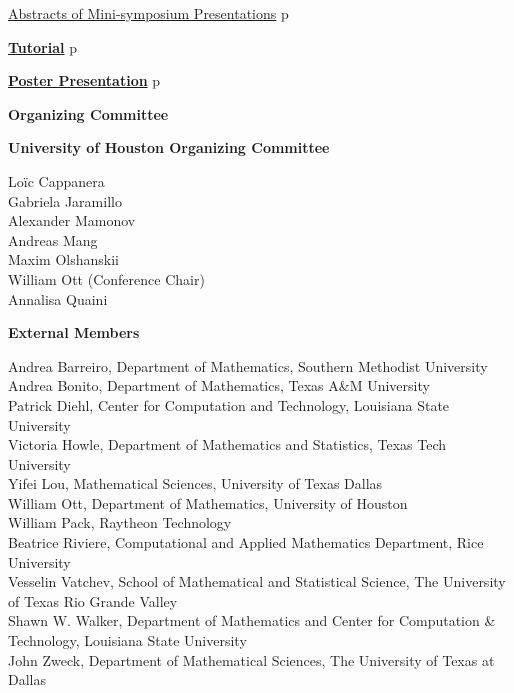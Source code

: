 \noindent\quad\hyperref[absmini]{{\large  Abstracts of Mini-symposium Presentations}}%
\dotfill{}p\pageref{absmini}
\vspace{3ex}

\noindent\hyperref[tutorial]{{\bfseries\large  Tutorial}}%
\dotfill{}p\pageref{tutorial}
\vspace{3ex}

\noindent\hyperref[poster]{{\bfseries\large  Poster Presentation}}
\dotfill{}p\pageref{poster}

\newpage\newpage
\thispagestyle{empty}
\newpage
\clearpage


\thispagestyle{empty}
\label{committee}
\centerline{\bfseries\Large Organizing Committee}
\vspace{10ex}

\noindent
{\bfseries\large  University of Houston Organizing Committee}
\vspace{1ex}

\noindent
Loïc Cappanera\\
Gabriela Jaramillo\\
Alexander Mamonov\\
Andreas Mang\\
Maxim Olshanskii\\
William Ott (Conference Chair)\\
Annalisa Quaini

\vspace{4ex}

\noindent
{\bfseries\large  External Members}

\vspace{1ex}

\noindent
Andrea Barreiro, Department of Mathematics, Southern Methodist University\\
Andrea Bonito, Department of Mathematics, Texas A\&M University\\
Patrick Diehl, Center for Computation and Technology, Louisiana State University\\
Victoria Howle, Department of Mathematics and Statistics, Texas Tech University\\
Yifei Lou, Mathematical Sciences, University of Texas Dallas\\
William Ott, Department of Mathematics, University of Houston\\
William Pack, Raytheon Technology\\
Beatrice Riviere, Computational and Applied Mathematics Department, Rice University\\
Vesselin Vatchev, School of Mathematical and Statistical Science, The University of Texas Rio Grande Valley\\
Shawn W. Walker, Department of Mathematics and Center for Computation \& Technology, Louisiana State University\\
John Zweck, Department of Mathematical Sciences, The University of Texas at Dallas\\


\clearpage
